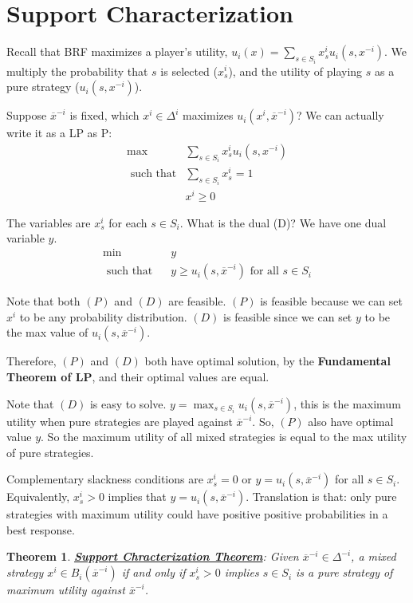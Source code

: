 \documentclass[twoside]{article}
\newcounter{lecnum}
\newtheorem{prototheorem}{Theorem}[lecnum]
\newenvironment{theorem}
{\colorlet{shadecolor}{orange!15}\begin{shaded}\begin{prototheorem}\normalfont}
		{\end{prototheorem}\end{shaded}}
\begin{document}
\section{Support Characterization}

Recall that BRF maximizes a player's utility, $u_i(x) = \sum_{s \in S_i}x_s^iu_i(s, x^{-i})$. We multiply the probability that $s$ is selected ($x_s^i$), and the utility of playing $s$ as a pure strategy ($u_i(s, x^{-i})$). 

Suppose $\overline{x}^{-i}$ is fixed, which $x^i \in \Delta^i$ maximizes $u_i(x^i,\overline{x}^{-i})$? We can actually write it as a LP as P: \begin{align*}
\max &\sum_{s \in S_i}x_s^iu_i(s, x^{-i})\\
\text{ such that} &\sum_{s \in S_i}x_s^i= 1\\
&x^i \geq 0
\end{align*}

The variables are $x_s^i$ for each $s \in S_i$. What is the dual (D)? We have one dual variable $y$. \begin{align*}
\min & \;\;\;y\\
\text{ such that} & \;\;\;y \geq u_i(s, \overline{x}^{-i}) \text{ for all } s \in S_i
\end{align*}

Note that both $(P)$ and $(D)$ are feasible. $(P)$ is feasible because we can set $x^i$ to be any probability distribution. $(D)$ is feasible since we can set $y$ to be the max value of $u_i(s, \overline{x}^{-i})$. 

Therefore, $(P)$ and $(D)$ both have optimal solution, by the \textbf{Fundamental Theorem of LP}, and their optimal values are equal. 

Note that $(D)$ is easy to solve. $y = \max_{s \in S_i} u_i(s, \overline{x}^{-i})$, this is the maximum utility when pure strategies are played against $\overline{x}^{-i}$. So, $(P)$ also have optimal value $y$. So the maximum utility of all mixed strategies is equal to the max utility of pure strategies. 

Complementary slackness conditions are $x_s^i = 0$ or $y = u_i(s, \overline{x}^{-i})$ for all $s \in S_i$. Equivalently, $x_s^i > 0$ implies that $y = u_i(s, \overline{x}^{-i})$. Translation is that: only pure strategies with maximum utility could have positive positive probabilities in a best response. 

\begin{theorem}
	\textbf{\underline{Support Chracterization Theorem}}: Given $\overline{x}^{-i} \in \Delta^{-i}$, a mixed strategy $x^i \in B_i(\overline{x}^{-i})$ if and only if $x_s^i > 0$ implies $s\in S_i$ is a pure strategy of maximum utility against $\overline{x}^{-i}$.  
\end{theorem} 
\end{document}
